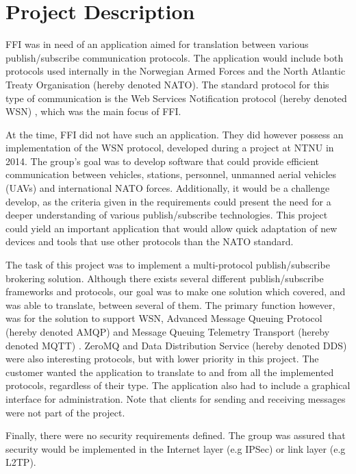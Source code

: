\section{Project Description}
\label{sec:introduction-project_description}

FFI was in need of an application aimed for translation between various publish/subscribe communication protocols. The application would include both protocols used internally in the Norwegian Armed Forces and the North Atlantic Treaty Organisation (hereby denoted NATO). The standard protocol for this type of communication is the Web Services Notification protocol (hereby denoted WSN) \cite{wsn-complete}, which was the main focus of FFI.

At the time, FFI did not have such an application. They did however possess an implementation of the WSN protocol, developed during a project at NTNU in 2014. The group's goal was to develop software that could provide efficient communication between vehicles, stations, personnel, unmanned aerial vehicles (UAVs) and international NATO forces. Additionally, it would be a challenge develop, as the criteria given in the requirements could present the need for a deeper understanding of various publish/subscribe technologies. This project could yield an important application that would allow quick adaptation of new devices and tools that use other protocols than the NATO standard.

The task of this project was to implement a multi-protocol publish/subscribe brokering solution. Although there exists several different publish/subscribe frameworks and protocols, our goal was to make one solution which covered, and was able to translate, between several of them. The primary function however, was for the solution to support WSN, Advanced Message Queuing Protocol (hereby denoted AMQP) \cite{amqp} and Message Queuing Telemetry Transport (hereby denoted MQTT) \cite{mqtt}. ZeroMQ \cite{zero-mq} and Data Distribution Service (hereby denoted DDS) \cite{dds} were also interesting protocols, but with lower priority in this project. The customer wanted the application to translate to and from all the implemented protocols, regardless of their type. The application also had to include a graphical interface for administration. Note that clients for sending and receiving messages were not part of the project.

Finally, there were no security requirements defined. The group was assured that security would be implemented in the Internet layer (e.g IPSec) or link layer (e.g L2TP).


